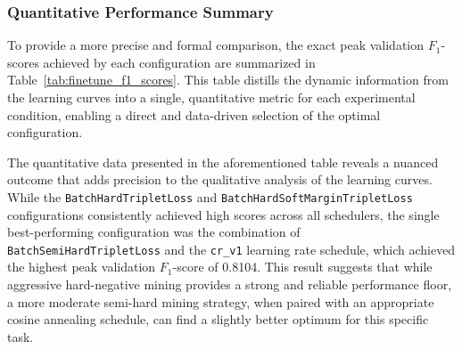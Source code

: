 \subsubsection{Quantitative Performance Summary}
To provide a more precise and formal comparison, the exact peak validation \(F_1\)-scores achieved by each configuration are summarized in Table~\ref{tab:finetune_f1_scores}. This table distills the dynamic information from the learning curves into a single, quantitative metric for each experimental condition, enabling a direct and data-driven selection of the optimal configuration.
\begin{table}[tb]
    \captionsetup{skip=5pt}
    \centering
    \caption{Peak Validation F1-Score of Fine-Tuning Configurations on BGE Model}
    \label{tab:finetune_f1_scores}
\end{table}
The quantitative data presented in the aforementioned table reveals a nuanced outcome that adds precision to the qualitative analysis of the learning curves. While the \verb|BatchHardTripletLoss| and \verb|BatchHardSoftMarginTripletLoss| configurations consistently achieved high scores across all schedulers, the single best-performing configuration was the combination of \verb|BatchSemiHardTripletLoss| and the \verb|cr_v1| learning rate schedule, which achieved the highest peak validation \(F_1\)-score of 0.8104. This result suggests that while aggressive hard-negative mining provides a strong and reliable performance floor, a more moderate semi-hard mining strategy, when paired with an appropriate cosine annealing schedule, can find a slightly better optimum for this specific task.

